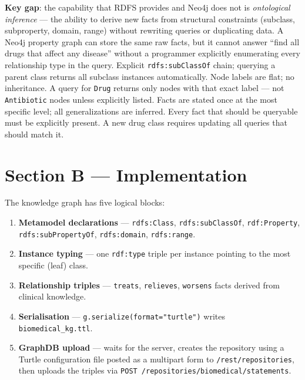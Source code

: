 \documentclass[11pt,a4paper]{article}
\begin{document}
\noindent \textbf{Key gap}: the capability that RDFS provides and Neo4j does not is
\emph{ontological inference} — the ability to derive new facts from structural
constraints (subclass, subproperty, domain, range) without rewriting queries
or duplicating data.  A Neo4j property graph can store the same raw facts, but
it cannot answer ``find all drugs that affect any disease'' without a
programmer explicitly enumerating every relationship type in the query.
Explicit \texttt{rdfs:subClassOf} chain; querying a parent class returns all
  subclass instances automatically.
Node labels are flat; no inheritance.  A query for \texttt{Drug} returns only
  nodes with that exact label — not \texttt{Antibiotic} nodes unless explicitly
  listed.
Facts are stated once at the most specific level; all generalizations are inferred. 
Every fact that should be queryable must be explicitly present.  A new drug class requires updating all queries that should match it.




\section{Section B — Implementation}

The knowledge graph has five logical blocks:

\begin{enumerate}[noitemsep]
  \item \textbf{Metamodel declarations} — \texttt{rdfs:Class},
        \texttt{rdfs:subClassOf}, \texttt{rdf:Property},
        \texttt{rdfs:subPropertyOf}, \texttt{rdfs:domain}, \texttt{rdfs:range}.
  \item \textbf{Instance typing} — one \texttt{rdf:type} triple per instance
        pointing to the most specific (leaf) class.
  \item \textbf{Relationship triples} — \texttt{treats}, \texttt{relieves},
        \texttt{worsens} facts derived from clinical knowledge.
  \item \textbf{Serialisation} — \texttt{g.serialize(format="turtle")} writes
        \texttt{biomedical\_kg.ttl}.
  \item \textbf{GraphDB upload} — waits for the server, creates the repository
        using a Turtle configuration file posted as a multipart form to
        \texttt{/rest/repositories}, then uploads the triples via
        \texttt{POST /repositories/biomedical/statements}.
\end{enumerate}
\end{document}
